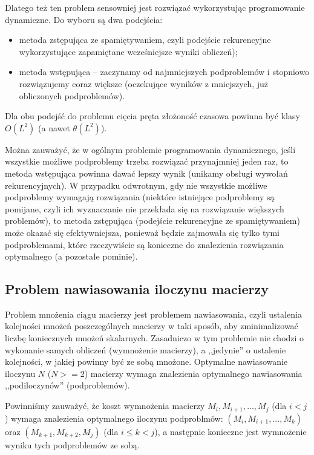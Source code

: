 \documentclass[twoside]{article}
\begin{document}
Dlatego też ten problem sensowniej jest rozwiązać wykorzystując programowanie dynamiczne.
Do wyboru są dwa podejścia:
\begin{itemize}
    \item metoda zstępująca ze spamiętywaniem, czyli podejście rekurencyjne wykorzystujące 
    zapamiętane wcześniejsze wyniki obliczeń);
    \item metoda wstępująca -- zaczynamy od najmniejszych podproblemów i stopniowo rozwiązujemy 
    coraz większe (oczekujące wyników z mniejszych, już obliczonych podproblemów).
\end{itemize}

Dla obu podejść do problemu cięcia pręta złożoność czasowa powinna być klasy $O(L^2)$ 
(a nawet $\theta(L^2)$).

Można zauważyć, że w ogólnym problemie programowania dynamicznego, jeśli wszystkie możliwe 
podproblemy trzeba rozwiązać przynajmniej jeden raz, to metoda wstępująca powinna dawać lepszy wynik
(unikamy obsługi wywołań rekurencyjnych).
W przypadku odwrotnym, gdy nie wszystkie możliwe podproblemy wymagają rozwiązania (niektóre 
istniejące podproblemy są pomijane, czyli ich wyznaczanie nie przekłada się na rozwiązanie 
większych problemów), to metoda zstępująca (podejście rekurencyjne ze spamiętywaniem) może okazać
się efektywniejsza, ponieważ będzie zajmowała się tylko tymi podproblemami, które rzeczywiście są
konieczne do znalezienia rozwiązania optymalnego (a pozostałe pominie).


\subsection{Problem nawiasowania iloczynu macierzy}

Problem mnożenia ciągu macierzy jest problemem nawiasowania, czyli ustalenia kolejności mnożeń
poszczególnych macierzy w taki sposób, aby zminimalizować liczbę koniecznych mnożeń skalarnych.
Zasadniczo w tym problemie nie chodzi o wykonanie samych obliczeń (wymnożenie macierzy), a 
,,jedynie'' o ustalenie kolejności, w jakiej powinny być ze sobą mnożone.
Optymalne nawiasowanie iloczynu $N$ ($N >= 2$) macierzy wymaga znalezienia optymalnego nawiasowania 
,,podiloczynów'' (podproblemów).

Powinniśmy zauważyć, że koszt wymnożenia macierzy $M_i, M_{i+1}, ..., M_j$ (dla $i < j$) wymaga 
znalezienia optymalnego iloczynu podproblmów: $(M_i, M_{i+1}, ..., M_k)$ oraz 
$(M_{k+1}, M_{k+2}, M_j)$ (dla $i \leq k < j$), 
a następnie konieczne jest wymnożenie wyniku tych podproblemów ze sobą.
\end{document}

